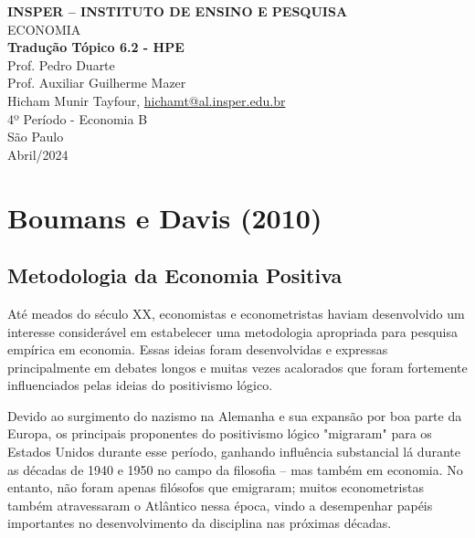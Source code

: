 \documentclass[12pt]{article}
\begin{document}
\begin{titlepage}
    \centering
    \vspace*{1cm}
    \Large\textbf{INSPER – INSTITUTO DE ENSINO E PESQUISA}\\
    \Large ECONOMIA\\
    \vspace{1.5cm}
    \Large\textbf{Tradução Tópico 6.2 - HPE}\\
    \vspace{1.5cm}
    Prof. Pedro Duarte\\
    Prof. Auxiliar Guilherme Mazer\\
    \vfill
    \normalsize
    Hicham Munir Tayfour, \href{mailto:hichamt@al.insper.edu.br}{hichamt@al.insper.edu.br}\\
    4º Período - Economia B\\
    \vfill
    São Paulo\\
    Abril/2024
\end{titlepage}

\newpage
\tableofcontents
\thispagestyle{empty} %
\newpage
\setcounter{page}{1} %
\justify
\onehalfspacing

\pagestyle{fancy}
\fancyhf{}
\rhead{\thepage}

\section{\textbf{Boumans e Davis (2010)}}
\subsection{\textbf{Metodologia da Economia Positiva}}

Até meados do século XX, economistas e econometristas
haviam desenvolvido um interesse considerável em estabelecer uma metodologia apropriada
para pesquisa empírica em economia. Essas ideias foram desenvolvidas
e expressas principalmente em debates longos e muitas vezes acalorados que foram
fortemente influenciados pelas ideias do positivismo lógico.

Devido ao surgimento do nazismo na Alemanha e sua expansão por
boa parte da Europa, os principais proponentes do positivismo lógico "migraram"
para os Estados Unidos durante esse período, ganhando influência substancial lá
durante as décadas de 1940 e 1950 no campo da filosofia – mas também em economia.
No entanto, não foram apenas filósofos que emigraram; muitos econometristas
também atravessaram o Atlântico nessa época, vindo a desempenhar papéis importantes
no desenvolvimento da disciplina nas próximas décadas.
\end{document}
